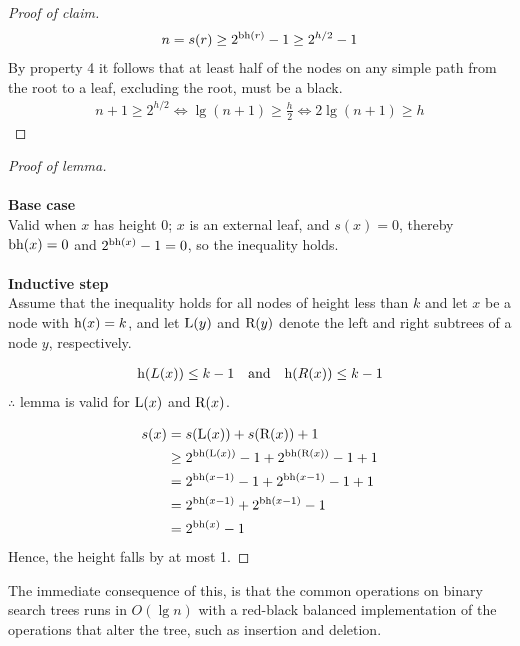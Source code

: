 \begin{proof}[Proof of claim]
	\begin{align}
		n = s(r) \geq 2^{\textnormal{bh}(r)} - 1 \geq 2^{h/2} - 1
	\end{align}
	By property 4 it follows that at least half of the nodes on any simple
	path from the root to a leaf, excluding the root, must be a black.
	\begin{align}
		n + 1 \geq 2^{h/2} \Leftrightarrow
		\lg(n+1) \geq \frac{h}{2} \Leftrightarrow
		2 \lg(n+1) \geq h
	\end{align}
\end{proof}

\begin{proof}[Proof of lemma] {\ } \\\\
	\textbf{Base case} \\
	Valid when $x$ has height $0$; $x$ is an external leaf, and $s(x) = 0$,
	thereby $\textnormal{bh}(x) = 0$ and $2^{\textnormal{bh}(x)}-1 = 0$, so
	the inequality holds.
	\\\\
	\textbf{Inductive step} \\
	Assume that the inequality holds for all nodes of height less than $k$ and
	let $x$ be a node with $\textnormal{h}(x) = k$, and let
	$\textnormal{L}(y)$ and $\textnormal{R}(y)$ denote the left and right
	subtrees of a node $y$, respectively.
	
	\begin{align}
		\textnormal{h}(L(x)) \leq k-1
		\quad \text{and} \quad
		\textnormal{h}(R(x)) \leq k-1
	\end{align}
	$\therefore$ lemma is valid for $\textnormal{L}(x)$ and $\textnormal{R}(x)$.
	
	\begin{align}
		s(x) &= s(\textnormal{L}(x)) + s(\textnormal{R}(x)) + 1 \\
		&\geq 2^{\textnormal{bh}(\textnormal{L}(x))}-1
		+ 2^{\textnormal{bh}(\textnormal{R}(x))}-1 + 1 \\
		&= 2^{\textnormal{bh}(x-1)}-1 + 2^{\textnormal{bh}(x-1)}-1 + 1 \\
		&= 2^{\textnormal{bh}(x-1)} + 2^{\textnormal{bh}(x-1)}-1 \\
		&= 2^{\textnormal{bh}(x)}-1
	\end{align}
	Hence, the height falls by at most 1.
\end{proof}
The immediate consequence of this, is that the common operations on binary
search trees runs in $O(\lg n)$ with a red-black balanced implementation of
the operations that alter the tree, such as insertion and deletion.

